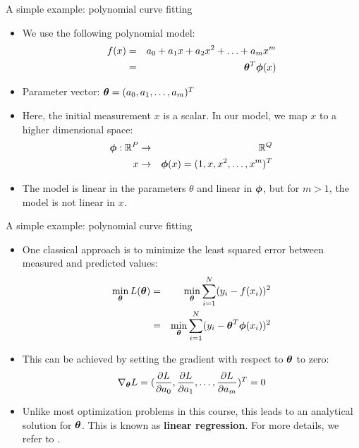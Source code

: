 \documentclass[xcolor=pdftex,dvipsnames,table,mathserif]{beamer}
\begin{document}
\begin{frame}{A simple example: polynomial curve fitting}
\begin{itemize}
	\item We use the following polynomial model:
	\begin{eqnarray}
	f(x) &=& a_0 + a_1 x + a_2 x^2 + \ldots + a_m x^m \nonumber \\
	&=& \boldsymbol{\theta}^T \boldsymbol{\phi} (x)
	\end{eqnarray}
	\item Parameter vector: $\boldsymbol{\theta} = (a_0, a_1, \ldots, a_m)^T$
	\item Here, the initial measurement $x$ is a scalar. In our model, we map $x$ to a higher dimensional space:
	\begin{eqnarray}
		\boldsymbol{\phi} : \mathbb{R}^{P} &\rightarrow & \mathbb{R}^Q \nonumber \\
		x &\rightarrow & \boldsymbol{\phi} (x) = (1, x, x^2, \ldots, x^m)^T
	\end{eqnarray}
	\item The model is linear in the parameters $\theta$ and linear in $\boldsymbol{\phi}$, but for $m>1$, the model is not linear in $x$.
\end{itemize}
\end{frame}

\begin{frame}{A simple example: polynomial curve fitting}
\begin{itemize}
	\item One classical approach is to minimize the least squared error between measured and predicted values:
	\begin{eqnarray}
		\min_{\boldsymbol{\theta}} L(\boldsymbol{\theta}) &=& \min_{\boldsymbol{\theta}} \sum_{i=1}^N (y_i - f(x_i))^2 \nonumber \\
		&=& \min_{\boldsymbol{\theta}} \sum_{i=1}^N (y_i - \boldsymbol{\theta}^T \boldsymbol{\phi} (x_i))^2
	\end{eqnarray}
	\item This can be achieved by setting the gradient with respect to $\boldsymbol{\theta}$ to zero:
	\begin{equation}
		\nabla_{\boldsymbol{\theta}} L = (\frac{\partial L}{\partial a_0}, \frac{\partial L}{\partial a_1}, \ldots, \frac{\partial L}{\partial a_m} )^T = 0
	\end{equation}
	\item Unlike most optimization problems in this course, this leads to an analytical solution for $\boldsymbol{\theta}$. This is known as \textbf{linear regression}. For more details, we refer to \cite{Hastie2009}.
\end{itemize}
\end{frame}
\end{document}
